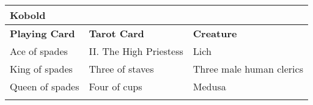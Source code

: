 \begin{longtable}{llllll}
{\begin{minipage}[t]{2.191in}
Kobold\end{minipage}}\\
\hline
\multicolumn{1}{|p{1.102in}|}{\begin{minipage}[t]{1.102in}\raggedright
\textbf{Playing Card}\end{minipage}} & \multicolumn{1}{p{1.207in}|}{\begin{minipage}[t]{1.207in}\raggedright
\textbf{Tarot Card}\end{minipage}} & \multicolumn{4}{p{2.191in}|}{\begin{minipage}[t]{2.191in}\raggedright
\textbf{Creature}\end{minipage}}\\
\hline
\multicolumn{1}{|p{1.102in}|}{\begin{minipage}[t]{1.102in}\raggedright
Ace of spades\end{minipage}} & \multicolumn{1}{p{1.207in}|}{\begin{minipage}[t]{1.207in}\raggedright
II. The High Priestess\end{minipage}} & \multicolumn{4}{p{2.191in}|}{\begin{minipage}[t]{2.191in}\raggedright
Lich\end{minipage}}\\
\hline
\multicolumn{1}{|p{1.102in}|}{\begin{minipage}[t]{1.102in}\raggedright
King of spades\end{minipage}} & \multicolumn{1}{p{1.207in}|}{\begin{minipage}[t]{1.207in}\raggedright
Three of staves\end{minipage}} & \multicolumn{4}{p{2.191in}|}{\begin{minipage}[t]{2.191in}\raggedright
Three male human clerics\end{minipage}}\\
\hline
\multicolumn{1}{|p{1.102in}|}{\begin{minipage}[t]{1.102in}\raggedright
Queen of spades\end{minipage}} & \multicolumn{1}{p{1.207in}|}{\begin{minipage}[t]{1.207in}\raggedright
Four of cups\end{minipage}} & \multicolumn{4}{p{2.191in}|}{\begin{minipage}[t]{2.191in}\raggedright
Medusa\end{minipage}}\\
\hline
\multicolumn{1}{|p{1.102in}|}{\begin{minipage}[t]{1.102in}\raggedright

\end{minipage}}
\end{longtable}
